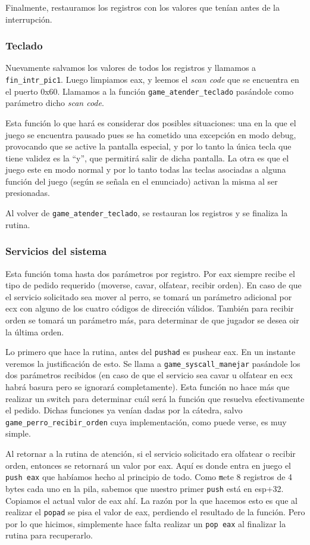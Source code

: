 	Finalmente, restauramos los registros con los valores que tenían antes de la interrupción.

	\subsubsection{Teclado}
	Nuevamente salvamos los valores de todos los registros y llamamos a \texttt{fin\_intr\_pic1}. Luego limpiamos eax, y leemos el \textit{scan code} que se encuentra en el puerto 0x60. Llamamos a la función \texttt{game\_atender\_teclado} pasándole como parámetro dicho \textit{scan code}. 

	Esta función lo que hará es considerar dos posibles situaciones: una en la que el juego se encuentra pausado pues se ha cometido una excepción en modo debug, provocando que se active la pantalla especial, y por lo tanto la única tecla que tiene validez es la ``y'', que permitirá salir de dicha pantalla. La otra es que el juego este en modo normal y por lo tanto todas las teclas asociadas a alguna función del juego (según se señala en el enunciado) activan la misma al ser presionadas.

	Al volver de \texttt{game\_atender\_teclado}, se restauran los registros y se finaliza la rutina.

	\subsubsection{Servicios del sistema}
	Esta función toma hasta dos parámetros por registro. Por eax siempre recibe el tipo de pedido requerido (moverse, cavar, olfatear, recibir orden). En caso de que el servicio solicitado sea mover al perro, se tomará un parámetro adicional por ecx con alguno de los cuatro códigos de dirección válidos. También para recibir orden se tomará un parámetro más, para determinar de que jugador se desea oir la última orden.

	Lo primero que hace la rutina, antes del \texttt{pushad} es pushear eax. En un instante veremos la justificación de esto. Se llama a \texttt{game\_syscall\_manejar} pasándole los dos parámetros recibidos (en caso de que el servicio sea cavar u olfatear en ecx habrá basura pero se ignorará completamente). Esta función no hace más que realizar un switch para determinar cuál será la función que resuelva efectivamente el pedido. Dichas funciones ya venían dadas por la cátedra, salvo \texttt{game\_perro\_recibir\_orden} cuya implementación, como puede verse, es muy simple.

	Al retornar a la rutina de atención, si el servicio solicitado era olfatear o recibir orden, entonces se retornará un valor por eax. Aquí es donde entra en juego el \texttt{push eax} que habíamos hecho al principio de todo. Como \texttt mete 8 registros de 4 bytes cada uno en la pila, sabemos que nuestro primer \texttt{push} está en esp+32. Copiamos el actual valor de eax ahí. La razón por la que hacemos esto es que  al realizar el \texttt{popad} se pisa el valor de eax, perdiendo el resultado de la función. Pero por lo que hicimos, simplemente hace falta realizar un \texttt{pop eax} al finalizar la rutina para recuperarlo.


